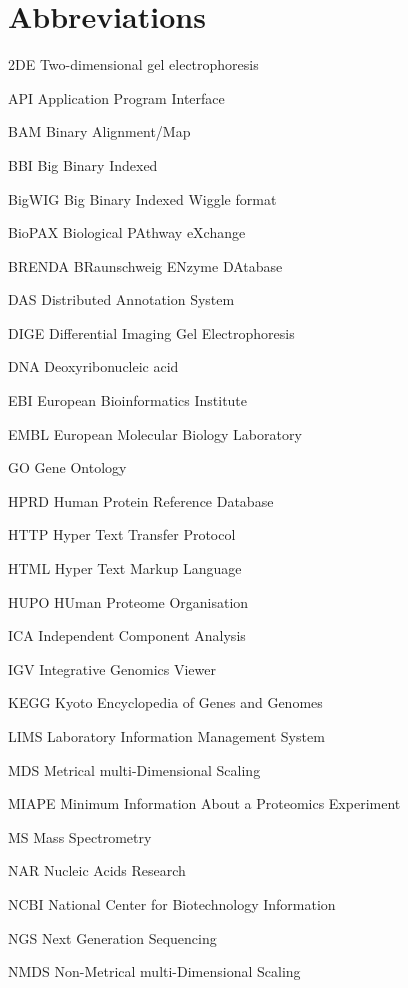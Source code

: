\chapter*{Abbreviations}
\begin{abbreviations}
\setlength\itemsep{-0.5em}
	\item[2DE] Two-dimensional gel electrophoresis
	\item[API] Application Program Interface
	\item[BAM] Binary Alignment/Map 
	\item[BBI] Big Binary Indexed
	\item[BigWIG] Big Binary Indexed Wiggle format
	\item[BioPAX] Biological PAthway eXchange
	\item[BRENDA] BRaunschweig ENzyme DAtabase
	\item[DAS] Distributed Annotation System 
	\item[DIGE] Differential Imaging Gel Electrophoresis
	\item[DNA]Deoxyribonucleic acid
	\item[EBI] European Bioinformatics Institute
	\item[EMBL] European Molecular Biology Laboratory
	\item[GO] Gene Ontology
	\item[HPRD] Human Protein Reference Database
	\item[HTTP] Hyper Text Transfer Protocol
	\item[HTML] Hyper Text Markup Language
	\item[HUPO] HUman Proteome Organisation 
	\item[ICA] Independent Component Analysis   
	\item[IGV] Integrative Genomics Viewer
	\item[KEGG] Kyoto Encyclopedia of Genes and Genomes
	\item[LIMS] Laboratory Information Management System
	\item[MDS] Metrical multi-Dimensional Scaling
	\item[MIAPE] Minimum Information About a Proteomics Experiment
	\item[MS] Mass Spectrometry
	\item[NAR] Nucleic Acids Research 
	\item[NCBI] National Center for Biotechnology Information
	\item[NGS] Next Generation Sequencing
	\item[NMDS] Non-Metrical multi-Dimensional Scaling

\end{abbreviations}
